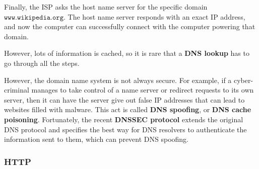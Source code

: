 \documentclass[a4paper, 12pt]{report}
\theoremstyle{remark}
\theoremstyle{definition}
\begin{document}
\begin{enumerate}
\begin{center}
    \end{center}
    Finally, the ISP asks the host name server for the specific domain $\texttt{www.wikipedia.org}$. The host name server responds with an exact IP address, and now the computer can successfully connect with the computer powering that domain. 
    \begin{center}
    \end{center}
    However, lots of information is cached, so it is rare that a \textbf{DNS lookup} has to go through all the steps. 
\end{enumerate}

However, the domain name system is not always secure. For example, if a cyber-criminal manages to take control of a name server or redirect requests to its own server, then it can have the server give out false IP addresses that can lead to websites filled with malware. This act is called \textbf{DNS spoofing}, or \textbf{DNS cache poisoning}. Fortunately, the recent \textbf{DNSSEC protocol} extends the original DNS protocol and specifies the best way for DNS resolvers to authenticate the information sent to them, which can prevent DNS spoofing. 

\subsubsection{HTTP}
\end{document}
